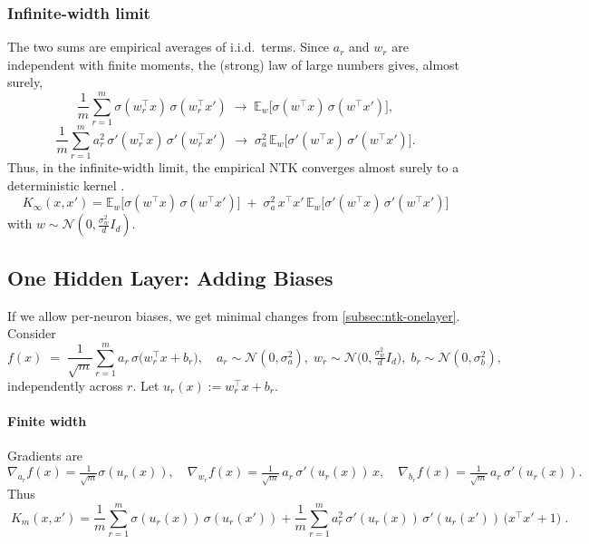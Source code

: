 \subsubsection*{Infinite-width limit}
The two sums are empirical averages of i.i.d.\ terms. Since $a_r$ and $w_r$ are independent with finite moments,
the (strong) law of large numbers gives, almost surely,
\[
	\frac{1}{m}\sum_{r=1}^m \sigma(w_r^\top x)\,\sigma(w_r^\top x')
	\;\longrightarrow\;
	\mathbb E_{w}\big[\sigma(w^\top x)\,\sigma(w^\top x')\big],
\]
\[
	\frac{1}{m}\sum_{r=1}^m a_r^2\,\sigma'(w_r^\top x)\,\sigma'(w_r^\top x')
	\;\longrightarrow\;
	\sigma_a^2\,\mathbb E_{w}\big[\sigma'(w^\top x)\,\sigma'(w^\top x')\big].
\]
Thus, in the infinite-width limit, the empirical NTK converges almost surely to a deterministic kernel
\citep{jacot2018ntk, lee2020wide}.
\[
	\boxed{\;
		K_\infty(x,x')
		=\mathbb E_{w}\!\big[\sigma(w^\top x)\,\sigma(w^\top x')\big]
		\;+\;
		\sigma_a^2\,x^\top x'\,\mathbb E_{w}\!\big[\sigma'(w^\top x)\,\sigma'(w^\top x')\big]}
	\;
\]
with $w\sim \mathcal N(0,\frac{\sigma_w^2}{d}I_d)$.


\subsection{One Hidden Layer: Adding Biases}\label{subsec:ntk-onelayer-bias}

If we allow per-neuron biases, we get minimal changes from \autoref{subsec:ntk-onelayer}.
Consider
\[
	f(x)\;=\;\frac{1}{\sqrt{m}}\sum_{r=1}^m a_r\,\sigma\!\big(w_r^\top x + b_r\big),
	\quad
	a_r \sim \mathcal N(0,\sigma_a^2),\;
	w_r \sim \mathcal N\!\Big(0,\tfrac{\sigma_w^2}{d}I_d\Big),\;
	b_r \sim \mathcal N(0,\sigma_b^2),
\]
independently across $r$. Let $u_r(x):=w_r^\top x + b_r$.

\paragraph{Finite width}

Gradients are
\[
	\nabla_{a_r} f(x)=\tfrac{1}{\sqrt{m}}\sigma(u_r(x)),\quad
	\nabla_{w_r} f(x)=\tfrac{1}{\sqrt{m}}\,a_r\,\sigma'(u_r(x))\,x,\quad
	\nabla_{b_r} f(x)=\tfrac{1}{\sqrt{m}}\,a_r\,\sigma'(u_r(x)).
\]
Thus
\[
	\boxed{\;
		K_m(x,x')
		=\frac{1}{m}\sum_{r=1}^m \sigma(u_r(x))\,\sigma(u_r(x'))
		+\frac{1}{m}\sum_{r=1}^m a_r^2\,\sigma'(u_r(x))\,\sigma'(u_r(x'))\,\big(x^\top x' + 1\big)\; }.
\]

